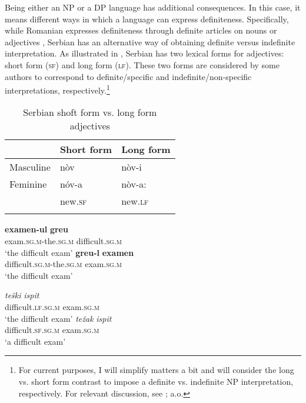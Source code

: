 \documentclass[output=paper,
hidelinks,
newtxmath,
]{langscibook}
\begin{document}
\noindent Being either an NP or a DP language has additional consequences. In this case, it means different ways in which a language can express definiteness. Specifically, while Romanian expresses definiteness through definite articles on nouns  or adjectives , Serbian has an alternative way of obtaining definite versus indefinite interpretation. As illustrated in , Serbian has two lexical forms for adjectives: short form (\textsc{sf}) and long form (\textsc{lf}). These two forms are considered by some authors \citep{Aljovic2002,Despic2011,Talic2014} to correspond to definite/specific  and indefinite/non-specific  interpretations, respectively.\footnote{\label{fn6}For current purposes, I will simplify matters a bit and will consider the long vs. short form contrast to impose a definite vs. indefinite NP interpretation, respectively. For relevant discussion, see \citet{Aljovic2002,Despic2011,Talic2014,Stankovic2015}; a.o.}

\begin{table}
    \centering
\begin{tabularx}{0.6\textwidth}{lXX}
  \lsptoprule
  & \textbf{Short form}&\textbf{Long form}\\\midrule
  Masculine & nòv & nòv-i\\
  Feminine & nóv-a & nòv-a:\\
  & new.\textsc{sf} & new.\textsc{lf}\\
  \lspbottomrule
\end{tabularx}
  \caption{Serbian shoft form vs. long form adjectives}\label{t1}
\end{table}


\ea \label{ex12}
	\ea\label{ex12a}
    \gll \textbf{examen-ul} \textbf{greu}\\          
        exam\textsc{.sg.m}-the\textsc{.sg.m} difficult\textsc{.sg.m}\\
	\glt `the difficult exam'
	\ex\label{ex12b}
    \gll \textbf{greu-l} \textbf{examen}\\
         difficult\textsc{.sg.m}-the\textsc{.sg.m} exam\textsc{.sg.m}\\ 
	\glt `the difficult exam'
	\z
\z

\ea \label{ex13}
	\ea\label{ex13a}
    \gll \textit{teški} \textit{ispit}\\          
        difficult\textsc{.lf.sg.m} exam\textsc{.sg.m}\\
        \glt `the difficult exam'
	\ex\label{ex13b}
    \gll \textit{težak} \textit{ispit}\\
         difficult\textsc{.sf.sg.m} exam\textsc{.sg.m}\\ 
         \glt `a difficult exam'
	\z
\z
\end{document}
